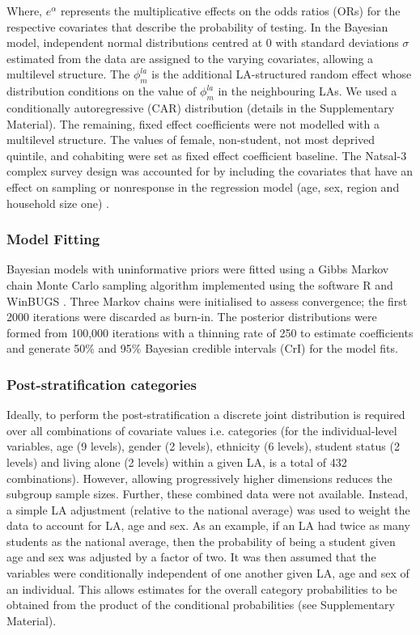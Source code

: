 \documentclass[12pt]{article}
\begin{document}
Where, $e^{\alpha}$ represents the multiplicative effects on the odds ratios (ORs) for the respective covariates that describe the probability of testing. In the Bayesian model, independent normal distributions centred at 0 with standard deviations $\sigma$ estimated from the data are assigned to the varying covariates, allowing a multilevel structure. The $\phi_m^{la}$ is the additional LA-structured random effect whose distribution conditions on the value of $\phi_m^{la}$ in the neighbouring LAs. We used a conditionally autoregressive (CAR) distribution (details in the Supplementary Material). The remaining, fixed effect coefficients were not modelled with a multilevel structure. The values of female, non-student, not most deprived quintile, and cohabiting were set as fixed effect coefficient baseline.
The Natsal-3 complex survey design was accounted for by including the covariates that have an effect on sampling or nonresponse in the regression model (age, sex, region and household size one) \cite{Gelman2007}.

\subsubsection*{Model Fitting}
Bayesian models with uninformative priors were fitted using a Gibbs Markov chain Monte Carlo sampling algorithm implemented using the software R \cite{RCoreTeam2017} and WinBUGS \cite{Lunn2000}. Three Markov chains were initialised to assess convergence; the first 2000 iterations were discarded as burn-in. The posterior distributions were formed from 100,000 iterations with a thinning rate of 250 to estimate coefficients and generate 50\% and 95\% Bayesian credible intervals (CrI) for the model fits.

\subsubsection*{Post-stratification categories}
Ideally, to perform the post-stratification a discrete joint distribution is required over all combinations of covariate values i.e. categories (for the individual-level variables, age (9 levels), gender (2 levels), ethnicity (6 levels), student status (2 levels) and living alone (2 levels) within a given LA, is a total of 432 combinations). However, allowing progressively higher dimensions reduces the subgroup sample sizes. Further, these combined data were not available. Instead, a simple LA adjustment (relative to the national average) was used to weight the data to account for LA, age and sex. As an example, if an LA had twice as many students as the national average, then the probability of being a student given age and sex was adjusted by a factor of two.
It was then assumed that the variables were conditionally independent of one another given LA, age and sex of an individual. This allows estimates for the overall category probabilities to be obtained from the product of the conditional probabilities (see Supplementary Material). 
\end{document}
